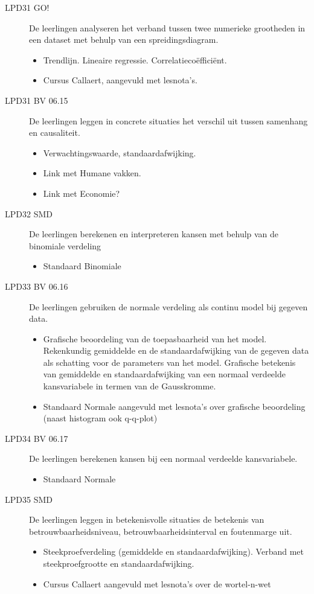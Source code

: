 \documentclass[a4paper,12pt, dutch, oneside ]{book}
\begin{document}
\begin{description}
\item[LPD31 GO!] De leerlingen analyseren het verband tussen twee numerieke grootheden in een dataset met behulp van een spreidingsdiagram.
\begin{itemize}
    \item Trendlijn. Lineaire regressie. Correlatiecoëfficiënt.
    \item Cursus Callaert, aangevuld met lesnota's.
\end{itemize}

\item[LPD31 BV 06.15] De leerlingen leggen in concrete situaties het verschil uit tussen samenhang en causaliteit.
\begin{itemize}
    \item Verwachtingswaarde, standaardafwijking.
    \item Link met Humane vakken.
    \item Link met Economie?
\end{itemize}

\item[LPD32 SMD] De leerlingen berekenen en interpreteren kansen met behulp van de binomiale verdeling
\begin{itemize}
    \item Standaard Binomiale
\end{itemize}

\item[LPD33 BV 06.16] De leerlingen gebruiken de normale verdeling als continu model bij gegeven data.
\begin{itemize}
    \item Grafische beoordeling van de toepasbaarheid van het model. Rekenkundig gemiddelde en de standaardafwijking van de gegeven data als schatting voor de parameters van het model. Grafische betekenis van gemiddelde en standaardafwijking van een normaal verdeelde kansvariabele in termen van de Gausskromme.
    \item Standaard Normale aangevuld met lesnota's over grafische beoordeling (naast histogram ook q-q-plot)
\end{itemize}

\item[LPD34 BV 06.17] De leerlingen berekenen kansen bij een normaal verdeelde kansvariabele.
\begin{itemize}
    \item Standaard Normale
\end{itemize}

\item[LPD35 SMD] De leerlingen leggen in betekenisvolle situaties de betekenis van betrouwbaarheidsniveau, betrouwbaarheidsinterval en foutenmarge uit.
\begin{itemize}
    \item Steekproefverdeling (gemiddelde en standaardafwijking). Verband met steekproefgrootte en standaardafwijking.
    \item Cursus Callaert aangevuld met lesnota's over de wortel-n-wet
\end{itemize}


\end{description}
\end{document}
